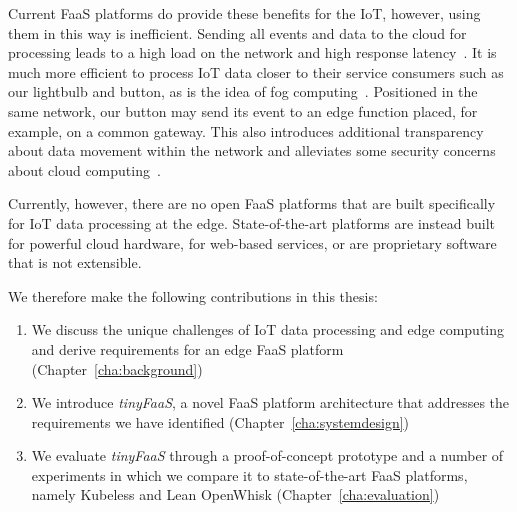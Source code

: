 Current FaaS platforms do provide these benefits for the IoT, however, using them in this way is inefficient.
Sending all events and data to the cloud for processing leads to a high load on the network and high response latency~\cite{paper_zhang_cloud_is_not_enough_GDP,paper_bermbach_fog_computing}.
It is much more efficient to process IoT data closer to their service consumers such as our lightbulb and button, as is the idea of fog computing~\cite{Bermbach2020-sf,Pfandzelter2019-so}.
Positioned in the same network, our button may send its event to an edge function placed, for example, on a common gateway.
This also introduces additional transparency about data movement within the network and alleviates some security concerns about cloud computing~\cite{Bonomi2012-if,paper_bermbach_fog_computing}.

Currently, however, there are no open FaaS platforms that are built specifically for IoT data processing at the edge.
State-of-the-art platforms are instead built for powerful cloud hardware, for web-based services, or are proprietary software that is not extensible.

We therefore make the following contributions in this thesis:

\begin{enumerate}
  \item We discuss the unique challenges of IoT data processing and edge computing and derive requirements for an edge FaaS platform (Chapter~\ref{cha:background})
  \item We introduce \textit{tinyFaaS}, a novel FaaS platform architecture that addresses the requirements we have identified (Chapter~\ref{cha:systemdesign})
  \item We evaluate \textit{tinyFaaS} through a proof-of-concept prototype and a number of experiments in which we compare it to state-of-the-art FaaS platforms, namely Kubeless and Lean OpenWhisk (Chapter~\ref{cha:evaluation})
\end{enumerate}
